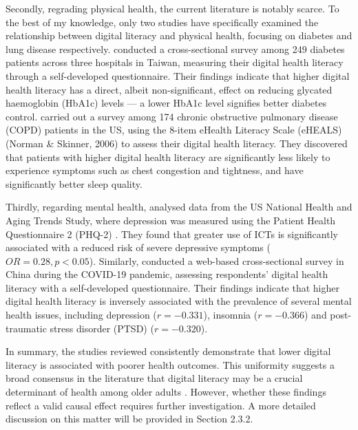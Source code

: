 Secondly, regrading physical health, the current literature is notably scarce. To the best of my knowledge, only two studies have specifically examined the relationship between digital literacy and physical health, focusing on diabetes and lung disease respectively. \textcite{guo_relationships_2021} conducted a cross-sectional survey among 249 diabetes patients across three hospitals in Taiwan, measuring their digital health literacy through a self-developed questionnaire. Their findings indicate that higher digital health literacy has a direct, albeit non-significant, effect on reducing glycated haemoglobin (HbA1c) levels — a lower HbA1c level signifies better diabetes control. \textcite{stellefson_association_2019} carried out a survey among 174 chronic obstructive pulmonary disease (COPD) patients in the US, using the 8-item eHealth Literacy Scale (eHEALS) (Norman \& Skinner, 2006) to assess their digital health literacy. They discovered that patients with higher digital health literacy are significantly less likely to experience symptoms such as chest congestion and tightness, and have significantly better sleep quality.

Thirdly, regarding mental health, \textcite{lee_technology_2018} analysed data from the US National Health and Aging Trends Study, where depression was measured using the Patient Health Questionnaire 2 (PHQ-2) \parencite{kroenke_patient_2003}. They found that greater use of ICTs is significantly associated with a reduced risk of severe depressive symptoms ($OR = 0.28, p < 0.05$). Similarly, \textcite{yang_relationship_2021} conducted a web-based cross-sectional survey in China during the COVID-19 pandemic, assessing respondents' digital health literacy with a self-developed questionnaire. Their findings indicate that higher digital health literacy is inversely associated with the prevalence of several mental health issues, including depression ($r = -0.331$), insomnia ($r = -0.366$) and post-traumatic stress disorder (PTSD) ($r = -0.320$).

In summary, the studies reviewed consistently demonstrate that lower digital literacy is associated with poorer health outcomes. This uniformity suggests a broad consensus in the literature that digital literacy may be a crucial determinant of health among older adults \parencite{ariaslopez_digital_2023,vankessel_digital_2022}. However, whether these findings reflect a valid causal effect requires further investigation. A more detailed discussion on this matter will be provided in Section 2.3.2.


